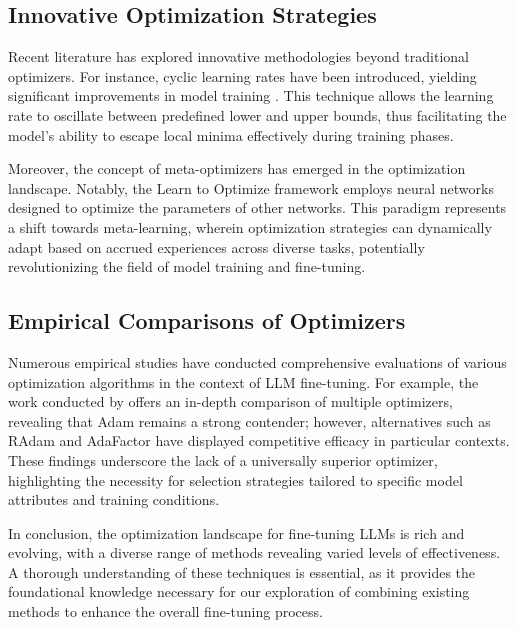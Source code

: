 \documentclass{article} %
\begin{document}
\subsection{Innovative Optimization Strategies}

Recent literature has explored innovative methodologies beyond traditional optimizers. For instance, cyclic learning rates have been introduced, yielding significant improvements in model training \cite{smith2017cyclical}. This technique allows the learning rate to oscillate between predefined lower and upper bounds, thus facilitating the model's ability to escape local minima effectively during training phases.

Moreover, the concept of meta-optimizers has emerged in the optimization landscape. Notably, the Learn to Optimize framework \cite{andrychowicz2016learning} employs neural networks designed to optimize the parameters of other networks. This paradigm represents a shift towards meta-learning, wherein optimization strategies can dynamically adapt based on accrued experiences across diverse tasks, potentially revolutionizing the field of model training and fine-tuning.

\subsection{Empirical Comparisons of Optimizers}

Numerous empirical studies have conducted comprehensive evaluations of various optimization algorithms in the context of LLM fine-tuning. For example, the work conducted by \cite{gordon2021comparative} offers an in-depth comparison of multiple optimizers, revealing that Adam remains a strong contender; however, alternatives such as RAdam \cite{liu2019variance} and AdaFactor \cite{shazeer2018adafactor} have displayed competitive efficacy in particular contexts. These findings underscore the lack of a universally superior optimizer, highlighting the necessity for selection strategies tailored to specific model attributes and training conditions.

In conclusion, the optimization landscape for fine-tuning LLMs is rich and evolving, with a diverse range of methods revealing varied levels of effectiveness. A thorough understanding of these techniques is essential, as it provides the foundational knowledge necessary for our exploration of combining existing methods to enhance the overall fine-tuning process.
\end{document}
